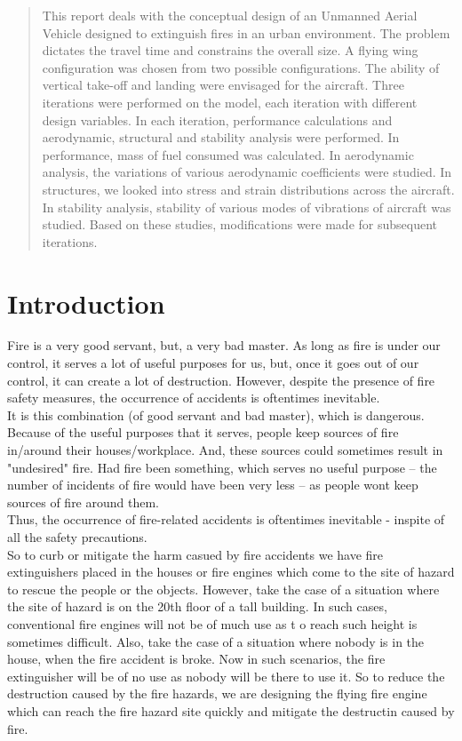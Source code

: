 \begin{abstract}
This report deals with the conceptual design of an Unmanned Aerial Vehicle designed to extinguish fires in an urban environment. The problem dictates the travel time and constrains the overall size. A flying wing configuration was chosen from two possible configurations. The ability of vertical take-off and landing were envisaged for the aircraft. Three iterations were performed on the model, each iteration with different design variables. In each iteration, performance calculations and aerodynamic, structural and stability analysis were performed. In performance, mass of fuel consumed was calculated. In aerodynamic analysis, the variations of various aerodynamic coefficients were studied. In structures, we looked into stress and strain distributions across the aircraft. In stability analysis, stability of various modes of vibrations of aircraft was studied. Based on these studies, modifications were made for subsequent iterations.
\end{abstract}

\chapter{Introduction}
Fire is a very good servant, but, a very bad master. As long as fire is under our control, it serves a lot of useful purposes for us, but, once it goes out of our control, it can create a lot of destruction. However, despite the presence of fire safety measures, the occurrence of accidents is oftentimes inevitable. \\
It is this combination (of good servant and bad master), which is dangerous.\\
Because of the useful purposes that it serves, people keep sources of fire in/around their houses/workplace. And, these sources could sometimes result in "undesired" fire. Had fire been something, which serves no useful purpose – the number of incidents of fire would have been very less – as people wont keep sources of fire around them.\\
Thus, the occurrence of fire-related accidents is oftentimes inevitable - inspite of all the safety precautions.\\
So to curb or mitigate the harm casued by fire accidents we have fire extinguishers placed in the houses or fire engines which come to the site of hazard to rescue the people or the objects. However, take the case of a situation where the site of hazard is on the 20th floor of a tall building. In such cases, conventional fire engines will not be of much use as t o reach such height is sometimes difficult. Also, take the case of a situation where nobody is in the house, when the fire accident is broke. Now in such scenarios, the fire extinguisher will be of no use as nobody will be there to use it. So to reduce the destruction caused by the fire hazards, we are designing the flying fire engine which can reach the fire hazard site quickly and mitigate the destructin caused by fire.\\
